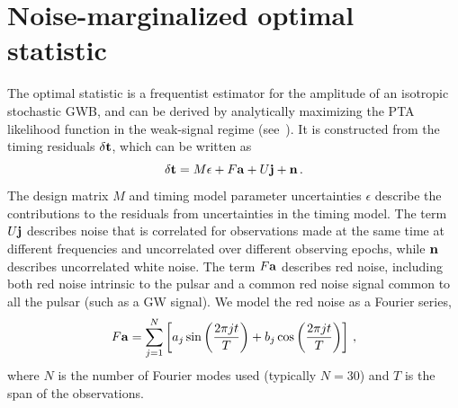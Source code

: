 \documentclass[twocolumn,aps,prd,superscriptaddress]{revtex4-1}
\newcommand{\res}{\ensuremath{\delta {\bf t}}}
\begin{document}
\section{Noise-marginalized optimal statistic}
\label{sec:marg_os}

The optimal statistic is a frequentist estimator 
for the amplitude of an isotropic stochastic GWB, 
and can be derived by analytically maximizing 
the PTA likelihood function in the weak-signal regime (see~\citet{abc+2009}). 
It is constructed from the timing residuals $\res$, 
which can be written as 
\begin{equation}
	\res = M {\bf{\epsilon}} + F {\bf{a}} + U {\bf{j}} + {\bf{n}} \,.
\end{equation}
The design matrix $M$ and timing model parameter uncertainties $\epsilon$ 
describe the contributions to the residuals from uncertainties in the timing model. 
The term $U{\bf{j}}$ describes noise that is correlated for observations made at the same time 
at different frequencies and uncorrelated over different observing epochs, 
while ${\bf{n}}$ describes uncorrelated white noise.
The term $F{\bf{a}}$ describes red noise, 
including both red noise intrinsic to the pulsar 
and a common red noise signal common to all the pulsar (such as a GW signal). 
We model the red noise as a Fourier series,
\begin{equation}
	F {\bf{a}} = \sum_{j=1}^N \left[ a_j \sin\left( \frac{2\pi j t}{T} \right) + b_j \cos \left( \frac{2\pi j t}{T} \right) \right] \,,
\end{equation}
where $N$ is the number of Fourier modes used (typically $N=30$) 
and $T$ is the span of the observations.
\end{document}
